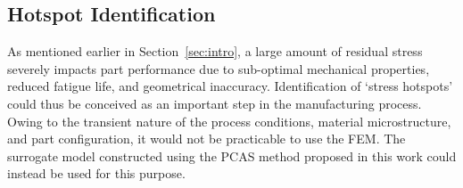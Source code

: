 \subsection{Hotspot Identification}
\label{sub:hotspot}

As mentioned earlier in Section~\ref{sec:intro}, a large amount of residual stress severely impacts part
performance due to sub-optimal mechanical properties, reduced fatigue life, and geometrical inaccuracy. 
Identification of `stress hotspots' could thus be conceived as an important step in the manufacturing process.
Owing to the transient nature of the process conditions, material microstructure, and part configuration,
it would not be practicable to use the FEM. The surrogate model constructed using the PCAS method
proposed in this work could instead be used for this purpose.

